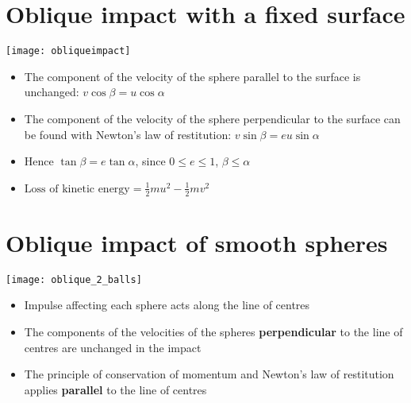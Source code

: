 \section{Oblique impact with a fixed surface}
\texttt{[image: obliqueimpact]}
\begin{itemize}
    \item The component of the velocity of the sphere parallel to the surface is unchanged: $v\cos\beta = u\cos\alpha$
    \item The component of the velocity of the sphere perpendicular to the surface can be found with Newton's law of restitution: $v\sin\beta = eu\sin\alpha$
    \item Hence $\tan\beta = e\tan\alpha$, since $0 \leq e \leq 1$, $\beta \leq \alpha$
    \item $\text{Loss of kinetic energy}=\frac{1}{2}mu^2-\frac{1}{2}mv^2$
\end{itemize}
\section{Oblique impact of smooth spheres}
\texttt{[image: oblique\_2\_balls]}
\begin{itemize}
    \item Impulse affecting each sphere acts along the line of centres
    \item The components of the velocities of the spheres \textbf{perpendicular}  to the line of centres are unchanged in the impact
    \item The principle of conservation of momentum and Newton's law of restitution applies \textbf{parallel} to the line of centres
\end{itemize}